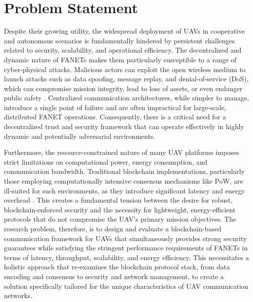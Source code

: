 \section{Problem Statement}
\label{sec:problem_statement}

Despite their growing utility, the widespread deployment of UAVs in cooperative and autonomous scenarios is fundamentally hindered by persistent challenges related to security, scalability, and operational efficiency. The decentralized and dynamic nature of FANETs makes them particularly susceptible to a range of cyber-physical attacks. Malicious actors can exploit the open wireless medium to launch attacks such as data spoofing, message replay, and denial-of-service (DoS), which can compromise mission integrity, lead to loss of assets, or even endanger public safety \cite{luo2023escm}. Centralized communication architectures, while simpler to manage, introduce a single point of failure and are often impractical for large-scale, distributed FANET operations. Consequently, there is a critical need for a decentralized trust and security framework that can operate effectively in highly dynamic and potentially adversarial environments.

Furthermore, the resource-constrained nature of many UAV platforms imposes strict limitations on computational power, energy consumption, and communication bandwidth. Traditional blockchain implementations, particularly those employing computationally intensive consensus mechanisms like PoW, are ill-suited for such environments, as they introduce significant latency and energy overhead \cite{hossain2024blockchain}. This creates a fundamental tension between the desire for robust, blockchain-enforced security and the necessity for lightweight, energy-efficient protocols that do not compromise the UAV's primary mission objectives. The research problem, therefore, is to design and evaluate a blockchain-based communication framework for UAVs that simultaneously provides strong security guarantees while satisfying the stringent performance requirements of FANETs in terms of latency, throughput, scalability, and energy efficiency. This necessitates a holistic approach that re-examines the blockchain protocol stack, from data encoding and consensus to security and network management, to create a solution specifically tailored for the unique characteristics of UAV communication networks.
